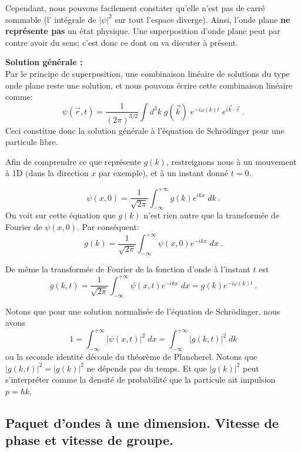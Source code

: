 \documentclass{book}
\begin{document}
Cependant, nous pouvons facilement constater qu'elle n'est pas de carré sommable (l' intégrale de $\vert \psi \vert^2$ sur tout l'espace diverge). Ainsi, l'onde plane \textbf{ne représente pas} un état physique. Une superposition d'onde plane peut par contre avoir du sens; c'est donc ce dont on va discuter à présent. 

\textbf{Solution générale :} \\
Par le principe de superposition, une combinaison linéaire de solutions du type onde plane reste une solution, et nous pouvons écrire cette combinaison linéaire comme: 
\begin{equation} \label{eq:schrod_sol_gen}
\psi(\vec r, t) = \dfrac{1}{(2\pi)^{3/2}} \int d ^3 k \; g(\vec k) \; e^{-i\omega(k) t} \; e^{i\vec k \cdot \vec r} \; .
\end{equation}
Ceci constitue donc la solution générale à l'équation de Schrödinger pour une particule libre.

Afin de comprendre ce que représente $g(k)$, restreignons nous à un mouvement à 1D (dans la direction $x$ par exemple), et à un instant donné $t=0$.

$$\psi(x,0) = \dfrac{1}{\sqrt{2\pi}} \int_{-\infty} ^{+\infty} g(k) e^{ikx} \; d k\ . $$
On voit sur cette équation que $g(k)$ n'est rien autre que la transformée de Fourier de $\psi(x,0)$. %
Par conséquent:
$$g(k) = \frac{1}{\sqrt{2 \pi}}\int_{-\infty} ^{+\infty} \psi(x,0) e^{-ikx} \; d x \ .
$$

De même la transformée de Fourier de la fonction d'onde à l'instant $t$ est 
$$g(k,t) = \frac{1}{\sqrt{2 \pi}}\int_{-\infty} ^{+\infty} \psi(x,t) e^{-ikx} \; d x 
=
g(k) e^{-i\omega(k) t}\ .
$$

Notons que pour une solution normalisée de l'équation de Schrödinger, nous avons
$$1 = \int_{-\infty} ^{+\infty}  \vert \psi(x,t) \vert^2\;  dx=
\int_{-\infty} ^{+\infty}  \vert g(k,t) \vert^2\;  dk$$
ou la seconde identité découle du théorème de Plancherel. Notons que 
$\vert g(k,t) \vert^2 = \vert g(k) \vert^2$ ne dépends pas du temps. Et que 
$\vert g(k) \vert^2$ peut s'interpréter comme la densité de probabilité que la particule ait impulsion $p=\hbar k$.

 



\subsection{Paquet d'ondes à une dimension. Vitesse de phase et vitesse de groupe.}
\end{document}
